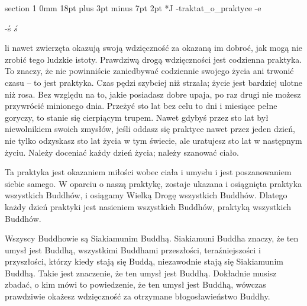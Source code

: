 \documentclass[12pt]{article}
\makeatletter
\renewcommand{\section}{\@startsection%
 {section}			%
 {1}				%
 {0mm}				%
 {18pt plus 3pt minus 7pt}	%
 { 2pt}				%
 {\bfseries}}			%
\newcounter{labelnum}
\newenvironment{Prayer}[4]{%
	\section*{#2}
	\ifx -#1
		\stepcounter{labelnum}\label{label.\arabic{labelnum}}\nopagebreak
	\else
		\label{#1}\nopagebreak
	\fi
	\ifx -#3
		\addcontentsline{toc}{section}{#2}
	\else
		\addcontentsline{toc}{section}{#3}
	\fi
	\ifx -#4
		{}
	\else
		\noindent\emph{#4}\par\nopagebreak
	\fi
	\begingroup
}
{\par\endgroup}
\makeatother
\begin{document}
\begin{Prayer}{traktat_o_praktyce}
Jeśli nawet zwierzęta okazują swoją wdzięczność za okazaną im dobroć, jak mogą nie zrobić tego ludzkie istoty. Prawdziwą drogą wdzięczności jest codzienna praktyka. To znaczy, że nie powinniście zaniedbywać codziennie swojego życia ani trwonić czasu -- to jest praktyka. Czas pędzi szybciej niż strzała; życie jest bardziej ulotne niż rosa. Bez względu na to, jakie posiadasz dobre upaja, po raz drugi nie możesz przywrócić minionego dnia. Przeżyć sto lat bez celu to dni i miesiące pełne goryczy, to stanie się cierpiącym trupem. Nawet gdybyś przez sto lat był niewolnikiem swoich zmysłów, jeśli oddasz się praktyce nawet przez jeden dzień, nie tylko odzyskasz sto lat życia w tym świecie, ale uratujesz sto lat w następnym życiu. Należy doceniać każdy dzień życia; należy szanować ciało. 


Ta praktyka jest okazaniem miłości wobec ciała i umysłu i jest poszanowaniem siebie samego. W oparciu o naszą praktykę, zostaje ukazana i osiągnięta praktyka wszystkich Buddhów, i osiągamy Wielką Drogę wszystkich Buddhów. Dlatego każdy dzień praktyki jest nasieniem wszystkich Buddhów, praktyką wszystkich Buddhów. 


Wszyscy Buddhowie są Siakiamunim Buddhą. Siakiamuni Buddha znaczy, że ten umysł jest Buddhą, wszystkimi Buddhami przeszłości, teraźniejszości i przyszłości, którzy kiedy stają się Buddą, niezawodnie stają się Siakiamunim Buddhą. Takie jest znaczenie, że ten umysł jest Buddhą. Dokładnie musisz zbadać, o kim mówi to powiedzenie, że ten umysł jest Buddhą, wówczas prawdziwie okażesz wdzięczność za otrzymane błogosławieństwo Buddhy.

\end{Prayer}
\end{document}
